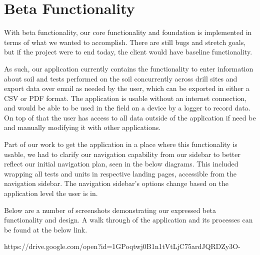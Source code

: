 \documentclass[onecolumn, draftclsnofoot,10pt, compsoc]{IEEEtran}
\begin{document}
\section{Beta Functionality}
With beta functionality, our core functionality and foundation is implemented in terms of what we wanted to accomplish. There are still bugs and stretch goals, but if the project were to end today, the client would have baseline functionality. \par
As such, our application currently contains the functionality to enter information about soil and tests performed on the soil concurrently across drill sites and export data over email as needed by the user, which can be exported in either a CSV or PDF format. The application is usable without an internet connection, and would be able to be used in the field on a device by a logger to record data. On top of that the user has access to all data outside of the application if need be and manually modifying it with other applications. \par
Part of our work to get the application in a place where this functionality is usable, we had to clarify our navigation capability from our sidebar to better reflect our initial navigation plan, seen in the below diagrams.
This included wrapping all tests and units in respective landing pages, accessible from the navigation sidebar. The navigation sidebar's options change based on the application level the user is in.\par
Below are a number of screenshots demonstrating our expressed beta functionality and design. A walk through of the application and its processes can be found at the below link.

https://drive.google.com/open?id=1GPoqtwj0B1n1tVtLjC75ardJQRDZy3O-
\end{document}
